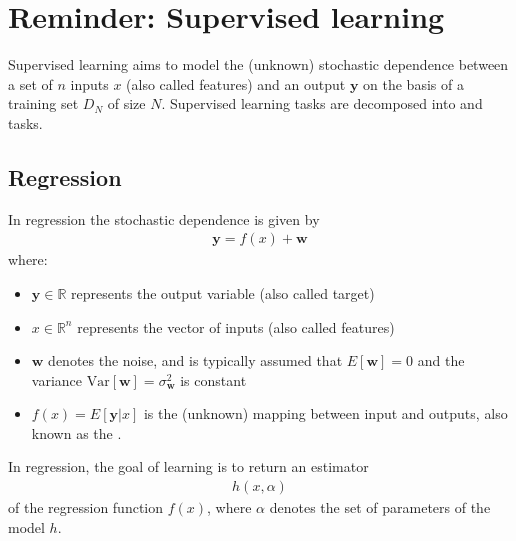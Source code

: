 \documentclass[letterpaper,10pt,english]{jupyterBook}
\begin{document}
\section{Reminder:  Supervised learning}
\label{\detokenize{05:reminder-supervised-learning}}
\sphinxAtStartPar
Supervised learning aims to model the (unknown) stochastic dependence between a set of \(n\) inputs \(x\) (also called features) and an output \({\mathbf y}\) on the basis of a training set \(D_N\) of size \(N\). Supervised learning tasks are decomposed into  and  tasks.


\subsection{Regression}
\label{\detokenize{05:regression}}
\sphinxAtStartPar
In regression the stochastic dependence is given by
\begin{equation*}
\begin{split} {\mathbf y} = f(x)+\mathbf{w}\end{split}
\end{equation*}
\sphinxAtStartPar
where:
\begin{itemize}
\item {} 
\sphinxAtStartPar
\(\mathbf{y} \in \mathbb{R}\) represents the output variable (also called target)

\item {} 
\sphinxAtStartPar
\(x \in \mathbb{R}^n\) represents the vector of inputs (also called features)

\item {} 
\sphinxAtStartPar
\(\mathbf{w}\) denotes the noise, and is typically assumed that \(E[\mathbf{w}]=0\) and the variance
\(\text{Var}[\mathbf{w}]=\sigma^2_{\mathbf{w}}\) is constant

\item {} 
\sphinxAtStartPar
\(f(x)=E[{\mathbf y} | x]\) is the (unknown) mapping between input and outputs, also known as the .

\end{itemize}

\sphinxAtStartPar
In regression, the goal of learning is to return an estimator
\begin{equation*}
\begin{split}h(x,\alpha)\end{split}
\end{equation*}
\sphinxAtStartPar
of the regression function \(f(x)\), where \(\alpha\) denotes the set of parameters of the model \(h\).
\end{document}
